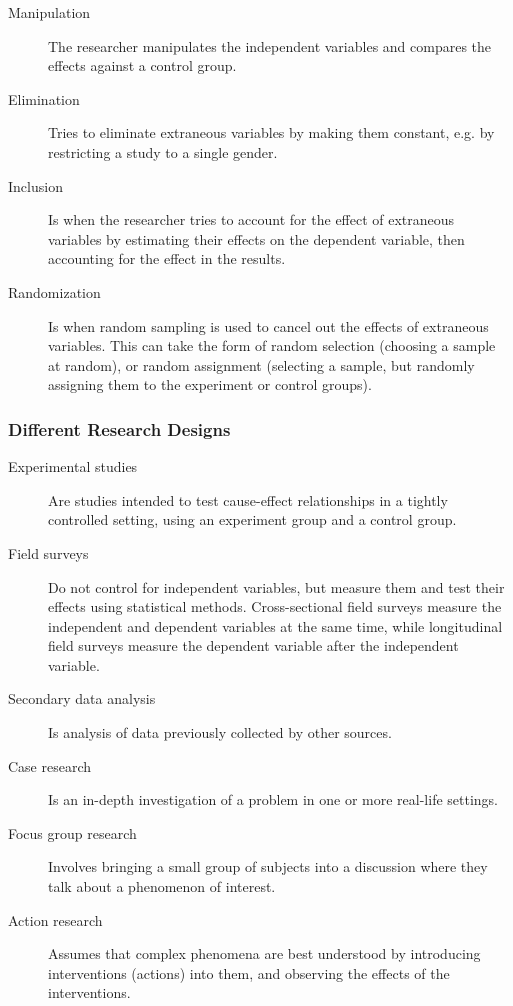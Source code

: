 \begin{description}
  \item[Manipulation] The researcher manipulates the independent
    variables and compares the effects against a control group.
  \item[Elimination] Tries to eliminate extraneous variables by making
    them constant, e.g. by restricting a study to a single gender.
  \item[Inclusion] Is when the researcher tries to account for the
    effect of extraneous variables by estimating their effects on the
    dependent variable, then accounting for the effect in the results.
  \item[Randomization] Is when random sampling is used to cancel out
    the effects of extraneous variables. This can take the form of
    random selection (choosing a sample at random), or random
    assignment (selecting a sample, but randomly assigning them to the
    experiment or control groups).
\end{description}

\subsubsection{Different Research Designs}

\begin{description}
  \item[Experimental studies] Are studies intended to test cause-effect
    relationships in a tightly controlled setting, using an experiment
    group and a control group.
  \item[Field surveys] Do not control for independent variables, but
    measure them and test their effects using statistical
    methods. Cross-sectional field surveys measure the independent and
    dependent variables at the same time, while longitudinal field
    surveys measure the dependent variable after the independent
    variable.
  \item[Secondary data analysis] Is analysis of data previously
    collected by other sources.
  \item[Case research] Is an in-depth investigation of a problem in
    one or more real-life settings.
  \item[Focus group research] Involves bringing a small group of
    subjects into a discussion where they talk about a phenomenon of
    interest.
  \item[Action research] Assumes that complex phenomena are best
    understood by introducing interventions (actions) into them, and
    observing the effects of the interventions.
\end{description}

